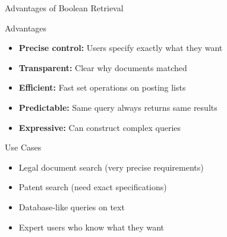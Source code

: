 \documentclass[aspectratio=169]{beamer}
\newif\ifanimated
\newcommand{\cpause}{\ifanimated\pause\fi}
\begin{document}
\begin{frame}[shrink=10]{Advantages of Boolean Retrieval}
\begin{block}{\checkmark Advantages}
\begin{itemize}
    \item[\checkmark] \textbf{Precise control:} Users specify exactly what they want
    \item[\checkmark] \textbf{Transparent:} Clear why documents matched
    \item[\checkmark] \textbf{Efficient:} Fast set operations on posting lists
    \item[\checkmark] \textbf{Predictable:} Same query always returns same results
    \item[\checkmark] \textbf{Expressive:} Can construct complex queries
\end{itemize}
\cpause
\end{block}
\vspace{1em}

\begin{exampleblock}{Use Cases}
\begin{itemize}
    \item Legal document search (very precise requirements)
    \item Patent search (need exact specifications)
    \item Database-like queries on text
    \item Expert users who know what they want
\end{itemize}
\cpause
\end{exampleblock}
\cpause
\end{frame}
\end{document}
